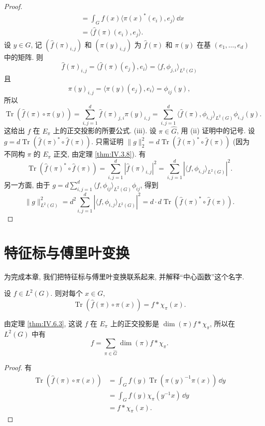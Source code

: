 \begin{proof}
\begin{align*}
&= \int_G f(x)\langle \pi(x)^*(e_i), e_j \rangle\,\dd x \\
&= \langle \hat{f}(\pi)(e_i), e_j \rangle.
\end{align*}
设 $y \in G$, 记 $(\hat{f}(\pi)_{i,j})$ 和 $(\pi(y)_{i,j})$ 为 $\hat{f}(\pi)$ 和 $\pi(y)$ 在基 $(e_1, \ldots, e_d)$ 中的矩阵. 则
\[
\hat{f}(\pi)_{i,j} = \langle \hat{f}(\pi)(e_j), e_i \rangle = \langle f, \phi_{j,i} \rangle_{L^2(G)}
\]
且
\[
\pi(y)_{i,j} = \langle \pi(y)(e_j), e_i \rangle = \phi_{ij}(y),
\]
所以
\[
\operatorname{Tr}(\hat{f}(\pi) \circ \pi(y)) = \sum_{i,j=1}^d\hat{f}(\pi)_{j,i}\pi(y)_{i,j} = \sum_{i,j=1}^d\langle \hat{f}(\pi), \phi_{i,j} \rangle_{L^2(G)}\phi_{i,j}(y).
\]
这给出 $f$ 在 $E_{\pi}$ 上的正交投影的所要公式.
(iii). 设 $\pi \in \widehat{G}$, 用 (ii) 证明中的记号. 设 $g = d\operatorname{Tr}(\hat{f}(\pi)^* \circ \hat{f}(\pi))$. 只需证明 $\|g\|_2^2 = d\operatorname{Tr}(\hat{f}(\pi)^* \circ \hat{f}(\pi))$ (因为不同构 $\pi$ 的 $E_{\pi}$ 正交, 由定理 \ref{thm:IV.3.8}). 有
\[
\operatorname{Tr}(\hat{f}(\pi)^* \circ \hat{f}(\pi)) = \sum_{i,j=1}^d|\hat{f}(\pi)_{i,j}|^2 = \sum_{i,j=1}^d|\langle f, \phi_{i,j} \rangle_{L^2(G)}|^2.
\]
另一方面, 由于 $g = d\sum_{i,j=1}^d\langle f, \phi_{ij} \rangle_{L^2(G)}\phi_{ij}$, 得到
\[
\|g\|_{L^2(G)}^2 = d^2\sum_{i,j=1}^d|\langle f, \phi_{i,j} \rangle_{L^2(G)}|^2 = d \cdot d\operatorname{Tr}(\hat{f}(\pi)^* \circ \hat{f}(\pi)).
\]
\end{proof}

\section{特征标与傅里叶变换}
为完成本章, 我们把特征标与傅里叶变换联系起来, 并解释``中心函数''这个名字.
\begin{proposition}[特征标与卷积]
\label{prop:IV.7.1}
设 $f \in L^2(G)$. 则对每个 $x \in G$,
\[
\operatorname{Tr}(\hat{f}(\pi) \circ \pi(x)) = f * \chi_{\pi}(x).
\]
\end{proposition}

由定理 \ref{thm:IV.6.3}, 这说 $f$ 在 $E_{\pi}$ 上的正交投影是 $\dim(\pi)f * \chi_{\pi}$, 所以在 $L^2(G)$ 中有
\[
f = \sum_{\pi \in \widehat{G}}\dim(\pi)f * \chi_{\pi}.
\]

\begin{proof}
有
\begin{align*}
\operatorname{Tr}(\hat{f}(\pi) \circ \pi(x)) &= \int_G f(y)\operatorname{Tr}(\pi(y)^{-1}\pi(x))\,\dd y \\
&= \int_G f(y)\chi_{\pi}(y^{-1}x)\,\dd y \\
&= f * \chi_{\pi}(x).
\end{align*}
\end{proof}

